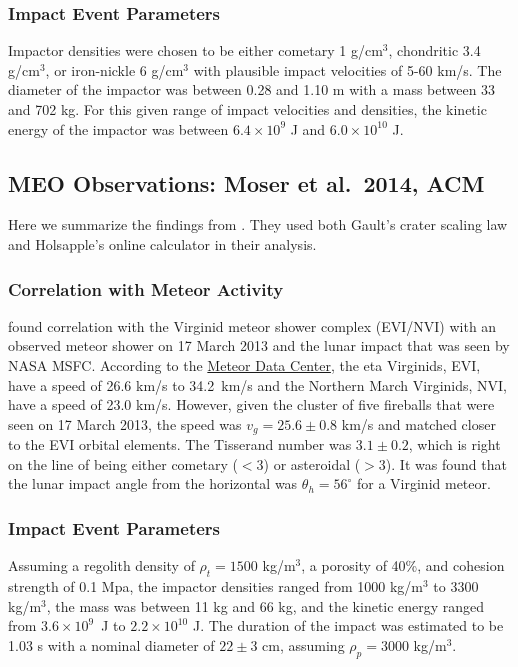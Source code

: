 \documentclass{hitec}
\begin{document}
\subsubsection{Impact Event Parameters}
Impactor densities were chosen to be either cometary 1 g/cm$^3$, chondritic 3.4 g/cm$^3$, or iron-nickle 6 g/cm$^3$ with plausible impact velocities of 5-60 km/s. The diameter of the impactor was between 0.28 and 1.10 m with a mass between 33 and 702 kg. For this given range of impact velocities and densities, the kinetic energy of the impactor was between $6.4\times 10^9$ J and $6.0\times 10^{10}$ J.

\subsection{MEO Observations: Moser et al.\ 2014, ACM}
Here we summarize the findings from \cite{moser2014large}. They used both Gault's crater scaling law \citep{gault1974impact} and Holsapple's online calculator \citep{holsapple1993scaling} in their analysis.

\subsubsection{Correlation with Meteor Activity}
\cite{moser2014large} found correlation with the Virginid meteor shower complex (EVI/NVI) with an observed meteor shower on 17 March 2013 and the lunar impact that was seen by NASA MSFC. According to the \href{https://www.ta3.sk/IAUC22DB/MDC2007/Roje/pojedynczy_obiekt.php?kodstrumienia=00011&colecimy=1&kodmin=00001&kodmax=00569&sortowanie=0}{Meteor Data Center}, the eta Virginids, EVI, have a speed of 26.6 km/s to 34.2~km/s and the Northern March Virginids, NVI, have a speed of 23.0 km/s. However, given the cluster of five fireballs that were seen on 17 March 2013, the speed was $v_g = 25.6\pm 0.8$ km/s and matched closer to the EVI orbital elements. The Tisserand number was $3.1 \pm 0.2$, which is right on the line of being either cometary ($<3$) or asteroidal ($>3$). It was found that the lunar impact angle from the horizontal was $\theta_h = 56^\circ$ for a Virginid meteor.


\subsubsection{Impact Event Parameters}
Assuming a regolith density of $\rho_t = 1500$ kg/m$^3$, a porosity of 40\%, and cohesion strength of 0.1 Mpa, the impactor densities ranged from 1000 kg/m$^3$ to 3300 kg/m$^3$, the mass was between 11 kg and 66 kg, and the kinetic energy ranged from $3.6\times 10^9$~J to $2.2\times 10^{10}$ J. The duration of the impact was estimated to be 1.03 s with a nominal diameter of $22\pm 3$ cm, assuming $\rho_p = 3000$ kg/m$^3$.
\end{document}
